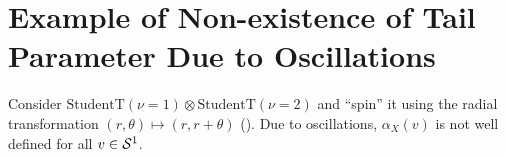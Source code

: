 \documentclass[thesis.tex]{subfiles}
\begin{document}

  


\section{Example of Non-existence of Tail Parameter Due to Oscillations}
\label{eg:spiral}

Consider $\text{StudentT}(\nu=1) \otimes \text{StudentT}(\nu=2)$ and ``spin'' it
using the radial transformation $(r,\theta) \mapsto (r,r+\theta)$ (). Due to
oscillations, $\alpha_X(v)$ is not well defined for all $v \in {\mathcal{S}}^{1}$.
\end{document}
